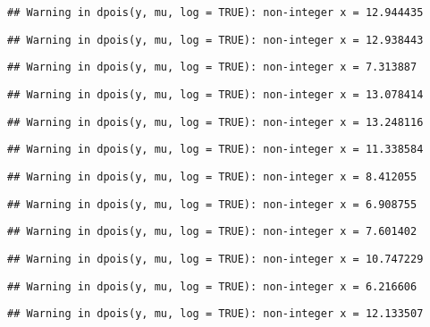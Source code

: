 \documentclass[
]{article}
\begin{document}
\begin{verbatim}
## Warning in dpois(y, mu, log = TRUE): non-integer x = 12.944435
\end{verbatim}

\begin{verbatim}
## Warning in dpois(y, mu, log = TRUE): non-integer x = 12.938443
\end{verbatim}

\begin{verbatim}
## Warning in dpois(y, mu, log = TRUE): non-integer x = 7.313887
\end{verbatim}

\begin{verbatim}
## Warning in dpois(y, mu, log = TRUE): non-integer x = 13.078414
\end{verbatim}

\begin{verbatim}
## Warning in dpois(y, mu, log = TRUE): non-integer x = 13.248116
\end{verbatim}

\begin{verbatim}
## Warning in dpois(y, mu, log = TRUE): non-integer x = 11.338584
\end{verbatim}

\begin{verbatim}
## Warning in dpois(y, mu, log = TRUE): non-integer x = 8.412055
\end{verbatim}

\begin{verbatim}
## Warning in dpois(y, mu, log = TRUE): non-integer x = 6.908755
\end{verbatim}

\begin{verbatim}
## Warning in dpois(y, mu, log = TRUE): non-integer x = 7.601402
\end{verbatim}

\begin{verbatim}
## Warning in dpois(y, mu, log = TRUE): non-integer x = 10.747229
\end{verbatim}

\begin{verbatim}
## Warning in dpois(y, mu, log = TRUE): non-integer x = 6.216606
\end{verbatim}

\begin{verbatim}
## Warning in dpois(y, mu, log = TRUE): non-integer x = 12.133507
\end{verbatim}
\end{document}
